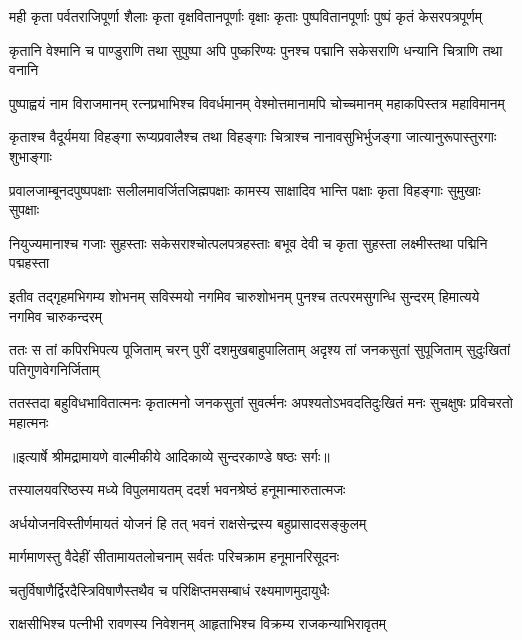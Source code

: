 \fourlineindentedshloka
{मही कृता पर्वतराजिपूर्णा}
{शैलाः कृता वृक्षवितानपूर्णाः}
{वृक्षाः कृताः पुष्पवितानपूर्णाः}
{पुष्पं कृतं केसरपत्रपूर्णम्} %

\fourlineindentedshloka
{कृतानि वेश्मानि च पाण्डुराणि}
{तथा सुपुष्पा अपि पुष्करिण्यः}
{पुनश्च पद्मानि सकेसराणि}
{धन्यानि चित्राणि तथा वनानि} %

\fourlineindentedshloka
{पुष्पाह्वयं नाम विराजमानम्}
{रत्नप्रभाभिश्च विवर्धमानम्}
{वेश्मोत्तमानामपि चोच्चमानम्}
{महाकपिस्तत्र महाविमानम्} %

\fourlineindentedshloka
{कृताश्च वैदूर्यमया विहङ्गा}
{रूप्यप्रवालैश्च तथा विहङ्गाः}
{चित्राश्च नानावसुभिर्भुजङ्गा}
{जात्यानुरूपास्तुरगाः शुभाङ्गाः} %

\fourlineindentedshloka
{प्रवालजाम्बूनदपुष्पपक्षाः}
{सलीलमावर्जितजिह्मपक्षाः}
{कामस्य साक्षादिव भान्ति पक्षाः}
{कृता विहङ्गाः सुमुखाः सुपक्षाः} %

\fourlineindentedshloka
{नियुज्यमानाश्च गजाः सुहस्ताः}
{सकेसराश्चोत्पलपत्रहस्ताः}
{बभूव देवी च कृता सुहस्ता}
{लक्ष्मीस्तथा पद्मिनि पद्महस्ता} %

\fourlineindentedshloka
{इतीव तद्गृहमभिगम्य शोभनम्}
{सविस्मयो नगमिव चारुशोभनम्}
{पुनश्च तत्परमसुगन्धि सुन्दरम्}
{हिमात्यये नगमिव चारुकन्दरम्} %

\fourlineindentedshloka
{ततः स तां कपिरभिपत्य पूजिताम्}
{चरन् पुरीं दशमुखबाहुपालिताम्}
{अदृश्य तां जनकसुतां सुपूजिताम्}
{सुदुःखितां पतिगुणवेगनिर्जिताम्} %

\fourlineindentedshloka
{ततस्तदा बहुविधभावितात्मनः}
{कृतात्मनो जनकसुतां सुवर्त्मनः}
{अपश्यतोऽभवदतिदुःखितं मनः}
{सुचक्षुषः प्रविचरतो महात्मनः} %


{॥इत्यार्षे श्रीमद्रामायणे वाल्मीकीये आदिकाव्ये सुन्दरकाण्डे षष्ठः सर्गः॥}


\twolineshloka
{तस्यालयवरिष्ठस्य मध्ये विपुलमायतम्}
{ददर्श भवनश्रेष्ठं हनूमान्मारुतात्मजः} %

\twolineshloka
{अर्धयोजनविस्तीर्णमायतं योजनं हि तत्}
{भवनं राक्षसेन्द्रस्य बहुप्रासादसङ्कुलम्} %

\twolineshloka
{मार्गमाणस्तु वैदेहीं सीतामायतलोचनाम्}
{सर्वतः परिचक्राम हनूमानरिसूदनः} %

\twolineshloka
{चतुर्विषाणैर्द्विरदैस्त्रिविषाणैस्तथैव च}
{परिक्षिप्तमसम्बाधं रक्ष्यमाणमुदायुधैः} %

\twolineshloka
{राक्षसीभिश्च पत्नीभी रावणस्य निवेशनम्}
{आहृताभिश्च विक्रम्य राजकन्याभिरावृतम्} %

